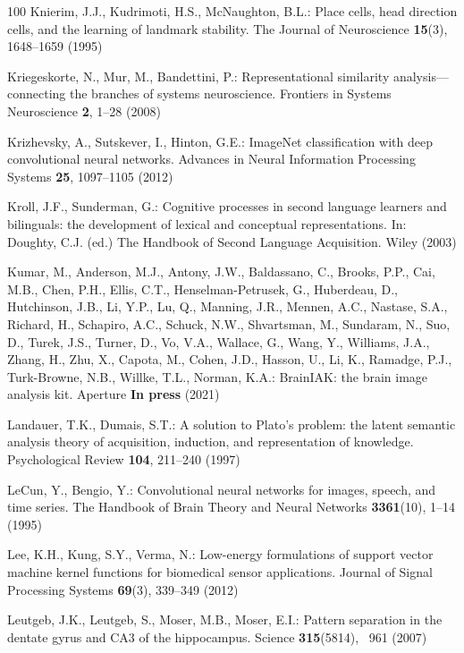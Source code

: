 \documentclass[runningheads]{llncs}
\begin{document}
\begin{thebibliography}{100}
Knierim, J.J., Kudrimoti, H.S., McNaughton, B.L.: Place cells, head direction
  cells, and the learning of landmark stability. The Journal of Neuroscience
  \textbf{15}(3),  1648--1659 (1995)

Kriegeskorte, N., Mur, M., Bandettini, P.: Representational similarity
  analysis--- connecting the branches of systems neuroscience. Frontiers in
  Systems Neuroscience  \textbf{2},  1--28 (2008)

Krizhevsky, A., Sutskever, I., Hinton, G.E.: {ImageNet} classification with
  deep convolutional neural networks. Advances in Neural Information Processing
  Systems  \textbf{25},  1097--1105 (2012)

Kroll, J.F., Sunderman, G.: Cognitive processes in second language learners and
  bilinguals: the development of lexical and conceptual representations. In:
  Doughty, C.J. (ed.) The Handbook of Second Language Acquisition. Wiley (2003)

Kumar, M., Anderson, M.J., Antony, J.W., Baldassano, C., Brooks, P.P., Cai,
  M.B., Chen, P.H., Ellis, C.T., Henselman-Petrusek, G., Huberdeau, D.,
  Hutchinson, J.B., Li, Y.P., Lu, Q., Manning, J.R., Mennen, A.C., Nastase,
  S.A., Richard, H., Schapiro, A.C., Schuck, N.W., Shvartsman, M., Sundaram,
  N., Suo, D., Turek, J.S., Turner, D., Vo, V.A., Wallace, G., Wang, Y.,
  Williams, J.A., Zhang, H., Zhu, X., Capota, M., Cohen, J.D., Hasson, U., Li,
  K., Ramadge, P.J., Turk-Browne, N.B., Willke, T.L., Norman, K.A.: {BrainIAK}:
  the brain image analysis kit. Aperture  \textbf{In press} (2021)

Landauer, T.K., Dumais, S.T.: A solution to {P}lato's problem: the latent
  semantic analysis theory of acquisition, induction, and representation of
  knowledge. Psychological Review  \textbf{104},  211--240 (1997)

LeCun, Y., Bengio, Y.: Convolutional neural networks for images, speech, and
  time series. The Handbook of Brain Theory and Neural Networks
  \textbf{3361}(10),  1--14 (1995)

Lee, K.H., Kung, S.Y., Verma, N.: Low-energy formulations of support vector
  machine kernel functions for biomedical sensor applications. Journal of
  Signal Processing Systems  \textbf{69}(3),  339--349 (2012)

Leutgeb, J.K., Leutgeb, S., Moser, M.B., Moser, E.I.: Pattern separation in the
  dentate gyrus and {CA3} of the hippocampus. Science  \textbf{315}(5814), ~961
  (2007)


\end{thebibliography}
\end{document}
